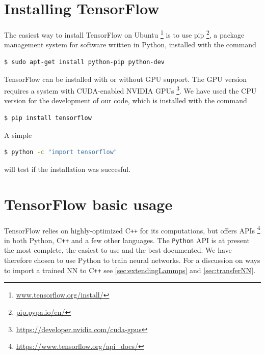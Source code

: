 \documentclass[twoside,english]{uiofysmaster}
\begin{document}
\section{Installing TensorFlow}
The easiest way to install TensorFlow on Ubuntu%
\footnote{\href{https://www.tensorflow.org/install/install\_linux}{www.tensorflow.org/install/}}
is to use pip%
\footnote{\href{https://pip.pypa.io/en/stable/}{pip.pypa.io/en/}},
a package management system for software written in 
Python, installed with the command
\begin{lstlisting}[language=bash]
 $ sudo apt-get install python-pip python-dev
\end{lstlisting}
TensorFlow can be installed with or without GPU 
support. The GPU version requires a system with
 CUDA-enabled NVIDIA GPUs
\footnote{\href{https://developer.nvidia.com/cuda-gpus}
{https://developer.nvidia.com/cuda-gpus}}. 
We have used the CPU version for the
development of our code, which is installed
with the command
\begin{lstlisting}[language=bash]
 $ pip install tensorflow
\end{lstlisting}
A simple
\begin{lstlisting}[language=bash]
 $ python -c "import tensorflow"
\end{lstlisting}
will test if the installation was succesful. 

\section{TensorFlow basic usage} \label{sec:TensorFlowBasic}
TensorFlow relies on highly-optimized
C\texttt{++} for its computations, but offers
APIs \footnote{\href{https://www.tensorflow.org/api_docs/}
{https://www.tensorflow.org/api\_docs/}}
in both Python,
C\texttt{++} and a few other languages. 
The \texttt{Python} API is at present the most
complete, the easiest to use and the best documented.
We have therefore chosen to use Python
to train neural networks. For a discussion
on ways to import a trained NN to C\texttt{++} see
\autoref{sec:extendingLammps} and \autoref{sec:transferNN}. 
\end{document}
